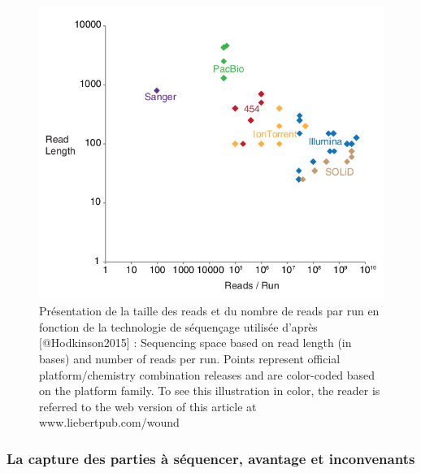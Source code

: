 \documentclass[12pt,twoside]{reedthesis}
\theoremstyle{definition}
\theoremstyle{definition}
\theoremstyle{remark}
\begin{document}
  \begin{figure}
  
  {\centering \includegraphics[scale=.55]{figure/read_per_run} 
  
  }
  
  \caption[Présentation de la taille des reads et du nombre de reads par run en fonction de la technologie de séquençage utilisée]{Présentation de la taille des reads et du nombre de reads par run en fonction de la technologie de séquençage utilisée d'après [@Hodkinson2015] : Sequencing space based on read length (in bases) and number of reads per run. Points represent official platform/chemistry combination releases and are color-coded based on the platform family. To see this illustration in color, the reader is referred to the web version of this article at www.liebertpub.com/wound}\label{fig:readPerRun}
  \end{figure}
  
  \subsubsection{La capture des parties à séquencer, avantage et
  inconvenants}\label{la-capture-des-parties-a-sequencer-avantage-et-inconvenants}
  
\end{document}
